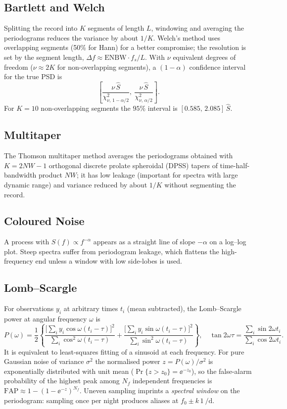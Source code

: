 \documentclass[11pt,a4paper]{article}
\begin{document}
\subsection{Bartlett and Welch}
Splitting the record into $K$ segments of length $L$, windowing and averaging the periodograms reduces the variance by about $1/K$. Welch's method uses overlapping segments (50\% for Hann) for a better compromise; the resolution is set by the segment length, $\Delta f\approx\mathrm{ENBW}\cdot f_s/L$. With $\nu$ equivalent degrees of freedom ($\nu\approx2K$ for non-overlapping segments), a $(1-\alpha)$ confidence interval for the true PSD is
\begin{equation}
  \left[\frac{\nu\,\hat S}{\chi^2_{\nu,\,1-\alpha/2}},\ \frac{\nu\,\hat S}{\chi^2_{\nu,\,\alpha/2}}\right].
  \label{eq:ci}
\end{equation}
For $K=10$ non-overlapping segments the $95\%$ interval is $[0.585,\,2.085]\,\hat S$.

\subsection{Multitaper}
The Thomson multitaper method averages the periodograms obtained with $K=2NW-1$ orthogonal discrete prolate spheroidal (DPSS) tapers of time-half-bandwidth product $NW$; it has low leakage (important for spectra with large dynamic range) and variance reduced by about $1/K$ without segmenting the record.

\subsection{Coloured Noise}
A process with $S(f)\propto f^{-\alpha}$ appears as a straight line of slope $-\alpha$ on a log--log plot. Steep spectra suffer from periodogram leakage, which flattens the high-frequency end unless a window with low side-lobes is used.

\subsection{Lomb--Scargle}
For observations $y_i$ at arbitrary times $t_i$ (mean subtracted), the Lomb--Scargle power at angular frequency $\omega$ is
\begin{equation}
  P(\omega)=\frac12\left\{\frac{\big[\sum_iy_i\cos\omega(t_i-\tau)\big]^2}{\sum_i\cos^2\omega(t_i-\tau)}+\frac{\big[\sum_iy_i\sin\omega(t_i-\tau)\big]^2}{\sum_i\sin^2\omega(t_i-\tau)}\right\},\quad
  \tan2\omega\tau=\frac{\sum_i\sin2\omega t_i}{\sum_i\cos2\omega t_i}.
  \label{eq:ls}
\end{equation}
It is equivalent to least-squares fitting of a sinusoid at each frequency. For pure Gaussian noise of variance $\sigma^2$ the normalised power $z=P(\omega)/\sigma^2$ is exponentially distributed with unit mean ($\Pr\{z>z_0\}=\ee^{-z_0}$), so the false-alarm probability of the highest peak among $N_f$ independent frequencies is $\mathrm{FAP}\approx1-(1-\ee^{-z})^{N_f}$. Uneven sampling imprints a \emph{spectral window} on the periodogram: sampling once per night produces aliases at $f_0\pm k\,\SI{1}{\per\day}$.
\end{document}
